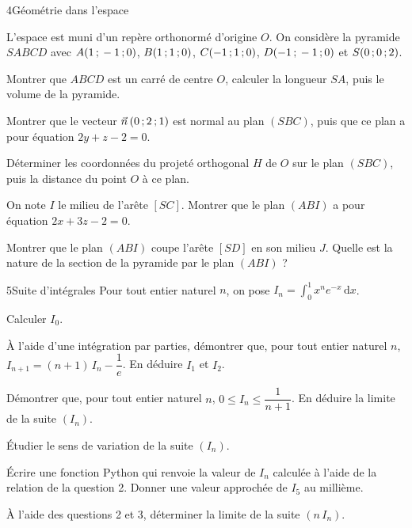 \begin{exoBac}{4}{Géométrie dans l'espace}
\begin{codecote}[0.6]
L'espace est muni d'un repère orthonormé d'origine $O$. On considère la pyramide $SABCD$ avec $A(1\,{;}\,-1\,{;}\,0)$, $B(1\,{;}\,1\,{;}\,0)$,
$C(-1\,{;}\,1\,{;}\,0)$, $D(-1\,{;}\,-1\,{;}\,0)$ et $S(0\,{;}\,0\,{;}\,2)$.
\begin{questions}
  \item Montrer que $ABCD$ est un carré de centre $O$, calculer la longueur $SA$, puis le volume de la pyramide.
  \item Montrer que le vecteur $\vec n\,(0\,{;}\,2\,{;}\,1)$ est normal au plan $(SBC)$, puis que ce plan a pour équation $2y+z-2=0$.
\end{questions}
\cote
\centering
{}
\end{codecote}
\begin{questions}[start=3]
  \item Déterminer les coordonnées du projeté orthogonal $H$ de $O$ sur le plan $(SBC)$, puis la distance du point $O$ à ce plan.
  \item On note $I$ le milieu de l'arête $[SC]$. Montrer que le plan $(ABI)$ a pour équation $2x+3z-2=0$.
  \item Montrer que le plan $(ABI)$ coupe l'arête $[SD]$ en son milieu $J$. Quelle est la nature de la section de la pyramide par le
    plan $(ABI)$ ?
\end{questions}
\end{exoBac}

\begin{exoBac}{5}{Suite d'intégrales}
Pour tout entier naturel $n$, on pose $I_n=\displaystyle\int_0^1x^{n}e^{-x}\,\mathrm{d}x$.
\begin{questions}
  \item Calculer $I_0$.
  \item À l'aide d'une intégration par parties, démontrer que, pour tout entier naturel $n$, $I_{n+1}=(n+1)\,I_n-\dfrac1e$. En déduire
    $I_1$ et $I_2$.
  \item Démontrer que, pour tout entier naturel $n$, $0\leq I_n\leq\dfrac{1}{n+1}$. En déduire la limite de la suite $(I_n)$.
  \item Étudier le sens de variation de la suite $(I_n)$.
  \item Écrire une fonction Python  qui renvoie la valeur de $I_n$ calculée à l'aide de la relation de la
    question 2. Donner une valeur approchée de $I_5$ au millième.
  \item À l'aide des questions 2 et 3, déterminer la limite de la suite $(n\,I_n)$.
\end{questions}
\end{exoBac}
